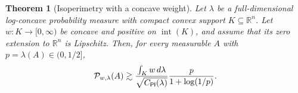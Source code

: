 \documentclass[11pt]{article}
\newtheorem{theorem}{Theorem}[section]
\theoremstyle{definition}
\theoremstyle{remark}
\newcommand{\R}{\mathbb R}
\newcommand{\cP}{\mathcal P}
\begin{document}

\begin{theorem}[Isoperimetry with a concave weight]
\label{thm:balanced-weighted}
Let $\lambda$ be a full-dimensional log-concave probability measure with compact convex support $K\subseteq\R^n$. Let  $w:K\to[0,\infty)$ be concave and positive on ${\operatorname{int}(K)}$, and assume that its zero extension to $\R^n$ is Lipschitz.
Then, for every measurable $A$ with $p=\lambda(A)\in (0,1/2]$, 
\begin{equation}\label{eq:balanced-weighted}
 \cP_{w,\lambda}(A)
 \gtrsim
 \frac{\int_Kw\,d\lambda}{\sqrt{C_{\sf PI}(\lambda)}}
 \frac{p}{1+\log(1/p)}.
\end{equation}
\end{theorem}
\end{document}
